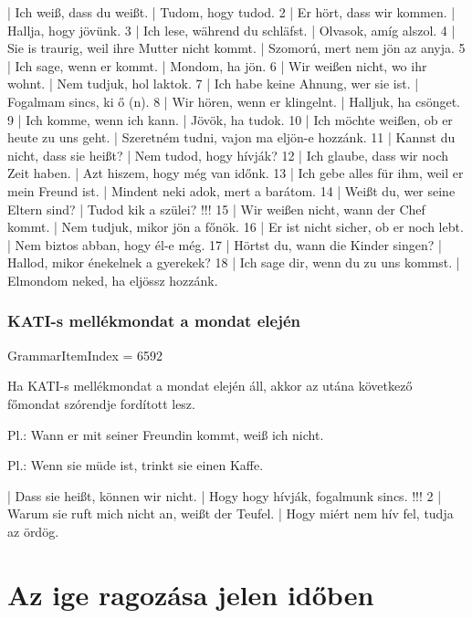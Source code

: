 \documentclass{article}
\newenvironment{desc}{\verbatim}{\endverbatim}
\newenvironment{exmp}{\verbatim}{\endverbatim}
\begin{document}
\begin{exmp}
1 | Ich weiß, dass du weißt. | Tudom, hogy tudod.
2 | Er hört, dass wir kommen. | Hallja, hogy jövünk.
3 | Ich lese, während du schläfst. | Olvasok, amíg alszol.
4 | Sie is traurig, weil ihre Mutter nicht kommt. | Szomorú, mert nem jön az anyja.
5 | Ich sage, wenn er kommt. | Mondom, ha jön.
6 | Wir weißen nicht, wo ihr wohnt. | Nem tudjuk, hol laktok.
7 | Ich habe keine Ahnung, wer sie ist. | Fogalmam sincs, ki ő (n).
8 | Wir hören, wenn er klingelnt. | Halljuk, ha csönget.
9 | Ich komme, wenn ich kann. | Jövök, ha tudok.
10 | Ich möchte weißen, ob er heute zu uns geht. | Szeretném tudni, vajon ma eljön-e hozzánk.
11 | Kannst du nicht, dass sie heißt? | Nem tudod, hogy hívják?
12 | Ich glaube, dass wir noch Zeit haben. | Azt hiszem, hogy még van időnk.
13 | Ich gebe alles für ihm, weil er mein Freund ist. | Mindent neki adok, mert a barátom.
14 | Weißt du, wer seine Eltern sind? | Tudod kik a szülei? !!!
15 | Wir weißen nicht, wann der Chef kommt. | Nem tudjuk, mikor jön a főnök.
16 | Er ist nicht sicher, ob er noch lebt. | Nem biztos abban, hogy él-e még.
17 | Hörtst du, wann die Kinder singen? | Hallod, mikor énekelnek a gyerekek?
18 | Ich sage dir, wenn du zu uns kommst. | Elmondom neked, ha eljössz hozzánk.
\end{exmp}

\subsubsection{KATI-s mellékmondat a mondat elején}

GrammarItemIndex = 6592

\begin{desc}
Ha KATI-s mellékmondat a mondat elején áll, akkor az utána következő főmondat szórendje fordított lesz.

Pl.: Wann er mit seiner Freundin kommt, weiß ich nicht.

Pl.: Wenn sie müde ist, trinkt sie einen Kaffe.
\end{desc}

\begin{exmp}
1 | Dass sie heißt, können wir nicht. | Hogy hogy hívják, fogalmunk sincs. !!!
2 | Warum sie ruft mich nicht an, weißt der Teufel. | Hogy miért nem hív fel, tudja az ördög.
\end{exmp}


\section{Az ige ragozása jelen időben}
\end{document}
